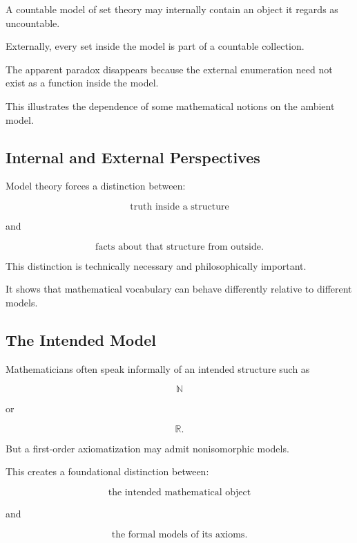 A countable model of set theory may internally contain an object it regards
as uncountable.

Externally, every set inside the model is part of a countable collection.

The apparent paradox disappears because the external enumeration need not
exist as a function inside the model.

This illustrates the dependence of some mathematical notions on the
ambient model.

\subsection{Internal and External Perspectives}
\label{subsec:foundational-internal-external}

Model theory forces a distinction between:

\[
\boxed{
\text{truth inside a structure}
}
\]

and

\[
\boxed{
\text{facts about that structure from outside}.
}
\]

This distinction is technically necessary and philosophically important.

It shows that mathematical vocabulary can behave differently relative to
different models.

\subsection{The Intended Model}
\label{subsec:intended-model}

Mathematicians often speak informally of an intended structure such as

\[
\boxed{
\mathbb{N}
}
\]

or

\[
\boxed{
\mathbb{R}.
}
\]

But a first-order axiomatization may admit nonisomorphic models.

This creates a foundational distinction between:

\[
\boxed{
\text{the intended mathematical object}
}
\]

and

\[
\boxed{
\text{the formal models of its axioms}.
}
\]

